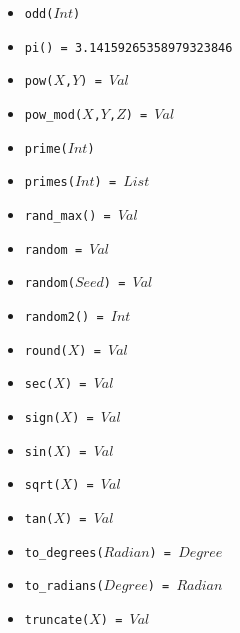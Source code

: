 \documentclass[10pt]{article}
\begin{document}
\begin{multicols}{2}
\begin{scriptsize}
\begin{itemize}
   \item \texttt{odd($Int$)} 
   \item \texttt{pi() = 3.14159265358979323846} 
   \item \texttt{pow($X$,$Y$) = $Val$}
   \item \texttt{pow\_mod($X$,$Y$,$Z$) = $Val$}
   \item \texttt{prime($Int$)} 
   \item \texttt{primes($Int$) = $List$} 
   \item \texttt{rand\_max() = $Val$} 
   \item \texttt{random = $Val$} 
   \item \texttt{random($Seed$) = $Val$} 
   \item \texttt{random2() = $Int$} 
   \item \texttt{round($X$) = $Val$}
   \item \texttt{sec($X$) = $Val$}
   \item \texttt{sign($X$) = $Val$}  
   \item \texttt{sin($X$) = $Val$} 
   \item \texttt{sqrt($X$) = $Val$} 
   \item \texttt{tan($X$) = $Val$}
   \item \texttt{to\_degrees($Radian$) = $Degree$} 
   \item \texttt{to\_radians($Degree$) = $Radian$}
   \item \texttt{truncate($X$) = $Val$}  

\end{itemize}
\end{scriptsize}
\end{multicols}
\end{document}
